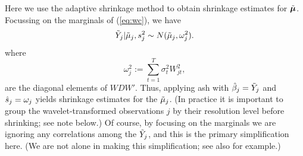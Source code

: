 \documentclass[12pt]{article}
\newcommand{\s}{\sigma}
\begin{document}

Here we use the adaptive shrinkage method to obtain shrinkage estimates for $\tilde{\bm{\mu}}$.
Focussing on the marginals of (\ref{eq:wc}), we have
\begin{equation} \label{eq:normlik}
\tilde{Y}_j | \tilde\mu_j, s^2_j \sim N(\tilde\mu_j, \omega^2_j).
\end{equation}
where
\begin{equation}
\omega^2_j:=\sum_{t=1}^T \s^2_t W_{jt}^2,
\end{equation}
are the diagonal elements of $WDW'$.
Thus, applying ash with $\hat{\beta}_j = \tilde{Y}_j$ and $\hat{s}_j = \omega_j$ yields shrinkage estimates for the $\tilde\mu_j$.
(In practice it is important to group the wavelet-transformed observations $j$ 
by their resolution level before shrinking; see note below.)
Of course, by focusing on the marginals we are ignoring any correlations among the $\tilde{Y}_j$, and this
is the primary simplification here. (We are not alone in making this simplification;
see also \cite{Silverman1999Wavelets} for example.) 
\end{document}
